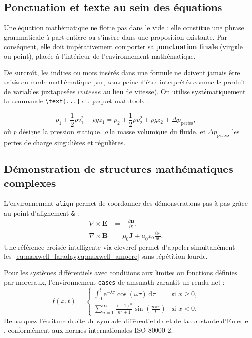 \subsection{Ponctuation et texte au sein des équations}
\label{subsec:ponctuation_maths}

Une équation mathématique ne flotte pas dans le vide : elle constitue une phrase grammaticale à part entière ou s'insère dans une proposition existante.
Par conséquent, elle doit impérativement comporter sa \textbf{ponctuation finale} (virgule ou point), placée à l'intérieur de l'environnement mathématique.

De surcroît, les indices ou mots insérés dans une formule ne doivent jamais être saisis en mode mathématique pur, sous peine d'être interprétés comme le produit de variables juxtaposées ($vitesse$ au lieu de $\text{vitesse}$).
On utilise systématiquement la commande \texttt{\textbackslash text\{...\}} du paquet \textsf{mathtools} :

\begin{equation}
  \label{eq:bernoulli_moderne}
  p_1 + \frac{1}{2} \rho v_1^2 + \rho g z_1 = p_2 + \frac{1}{2} \rho v_2^2 + \rho g z_2 + \Delta p_{\text{pertes}},
\end{equation}
où $p$ désigne la pression statique, $\rho$ la masse volumique du fluide, et $\Delta p_{\text{pertes}}$ les pertes de charge singulières et régulières.

\subsection{Démonstration de structures mathématiques complexes}
\label{subsec:structures_complexes}

L'environnement \texttt{align} permet de coordonner des démonstrations pas à pas grâce au point d'alignement \texttt{\&} :
\begin{align}
  \nabla \times \mathbf{E} &= -\frac{\partial \mathbf{B}}{\partial t}, \label{eq:maxwell_faraday} \\
  \nabla \times \mathbf{B} &= \mu_0 \mathbf{J} + \mu_0 \varepsilon_0 \frac{\partial \mathbf{E}}{\partial t}. \label{eq:maxwell_ampere}
\end{align}
Une référence croisée intelligente via \textsf{cleveref} permet d'appeler simultanément les~\cref{eq:maxwell_faraday,eq:maxwell_ampere} sans répétition lourde.

Pour les systèmes différentiels avec conditions aux limites ou fonctions définies par morceaux, l'environnement \texttt{cases} de \textsf{amsmath} garantit un rendu net :
\begin{equation}
  \label{eq:fonction_morceaux}
  f(x, t) = 
  \begin{cases}
    \int_0^t \mathrm{e}^{-\lambda \tau} \cos(\omega \tau) \, \mathrm{d}\tau & \text{si } x \ge 0, \\[2mm]
    \sum_{n=1}^{\infty} \frac{(-1)^n}{n^2 + 1} \sin\left(\frac{n \pi x}{L}\right) & \text{si } x < 0.
  \end{cases}
\end{equation}
Remarquez l'écriture droite du symbole différentiel $\mathrm{d}\tau$ et de la constante d'Euler $\mathrm{e}$, conformément aux normes internationales ISO 80000-2.

